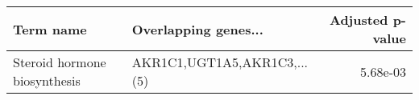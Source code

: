 \begin{tabular}{llr}
\toprule
                   Term name &        Overlapping genes... &  Adjusted p-value \\
\midrule
Steroid hormone biosynthesis & AKR1C1,UGT1A5,AKR1C3,...(5) &          5.68e-03 \\
\bottomrule
\end{tabular}
